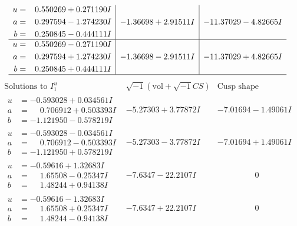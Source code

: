 \documentclass[1p]{elsarticle_modified}
\theoremstyle{definition}
\newcommand{\I}{\sqrt{-1}}
\begin{document}
$$\begin{array}{c|c|c}
\begin{aligned}
u &= \phantom{-}0.550269 + 0.271190 I \\
a &= \phantom{-}0.297594 - 1.274230 I \\
b &= \phantom{-}0.250845 - 0.444111 I\end{aligned}
 & -1.36698 + 2.91511 I & -11.37029 - 4.82665 I \\ \hline\begin{aligned}
u &= \phantom{-}0.550269 - 0.271190 I \\
a &= \phantom{-}0.297594 + 1.274230 I \\
b &= \phantom{-}0.250845 + 0.444111 I\end{aligned}
 & -1.36698 - 2.91511 I & -11.37029 + 4.82665 I\\
 \hline 
 \end{array}$$\newpage$$\begin{array}{c|c|c}  
\text{Solutions to }I^u_{1}& \I (\text{vol} + \sqrt{-1}CS) & \text{Cusp shape}\\
 \hline 
\begin{aligned}
u &= -0.593028 + 0.034561 I \\
a &= \phantom{-}0.706912 + 0.503393 I \\
b &= -1.121950 - 0.578219 I\end{aligned}
 & -5.27303 + 3.77872 I & -7.01694 - 1.49061 I \\ \hline\begin{aligned}
u &= -0.593028 - 0.034561 I \\
a &= \phantom{-}0.706912 - 0.503393 I \\
b &= -1.121950 + 0.578219 I\end{aligned}
 & -5.27303 - 3.77872 I & -7.01694 + 1.49061 I \\ \hline\begin{aligned}
u &= -0.59616 + 1.32683 I \\
a &= \phantom{-}1.65508 - 0.25347 I \\
b &= \phantom{-}1.48244 + 0.94138 I\end{aligned}
 & -7.6347 - 22.2107 I & \phantom{-0.000000 } 0 \\ \hline\begin{aligned}
u &= -0.59616 - 1.32683 I \\
a &= \phantom{-}1.65508 + 0.25347 I \\
b &= \phantom{-}1.48244 - 0.94138 I\end{aligned}
 & -7.6347 + 22.2107 I & \phantom{-0.000000 } 0 \\ \hline\begin{aligned}

\end{aligned}
\end{array}$$
\end{document}
